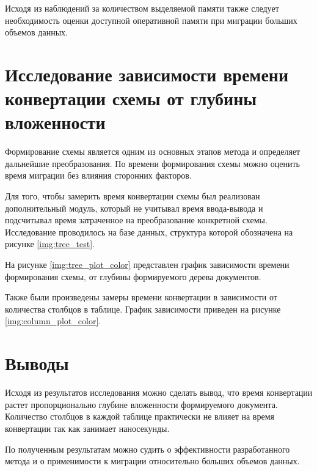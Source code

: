 Исходя из наблюдений за количеством выделяемой памяти также следует 
необходимость оценки доступной оперативной памяти при миграции больших объемов данных.  

\clearpage

\section{Исследование зависимости времени конвертации схемы от глубины вложенности}
Формирование схемы является одним из основных этапов метода и определяет дальнейшие преобразования.
По времени формирования схемы можно оценить время миграции без влияния сторонних факторов.

Для того, чтобы замерить время конвертации схемы был реализован дополнительный модуль, 
который не учитывал время ввода-вывода и подсчитывал время затраченное на преобразование конкретной схемы.
Исследование проводилось на базе данных, структура которой обозначена на рисунке \ref{img:tree_test}.

На рисунке \ref{img:tree_plot_color} представлен график зависимости времени формирования схемы, 
от глубины формируемого дерева документов.


Также были произведены замеры времени конвертации в зависимости от количества столбцов в таблице.
\clearpage
График зависимости приведен на рисунке \ref{img:column_plot_color}.


\section*{Выводы}
Исходя из результатов исследования можно сделать вывод, 
что время конвертации растет пропорционально глубине вложенности формируемого документа.
Количество столбцов в каждой таблице практически не влияет на время конвертации так как занимает наносекунды.
 
По полученным результатам можно судить о эффективности разработанного метода 
и о применимости к миграции относительно больших объемов данных.

